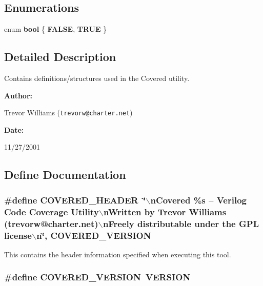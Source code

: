 \subsection*{Enumerations}
\begin{CompactItemize}
\item 
enum {\bf bool} \{ {\bf FALSE}, 
{\bf TRUE}
 \}
\end{CompactItemize}


\subsection{Detailed Description}
Contains definitions/structures used in the Covered utility.



\begin{Desc}
\item[{\bf Author: }]\par
Trevor Williams ({\tt trevorw@charter.net}) \end{Desc}
\begin{Desc}
\item[{\bf Date: }]\par
11/27/2001

\end{Desc}


\subsection{Define Documentation}
\subsubsection{\setlength{\rightskip}{0pt plus 5cm}\#define COVERED\_\-HEADER\ \char`\"{}$\backslash$n\-Covered \%s -- Verilog Code Coverage Utility$\backslash$n\-Written by Trevor Williams  (trevorw@charter.net)$\backslash$n\-Freely distributable under the GPL license$\backslash$n\char`\"{}, COVERED\_\-VERSION}\label{defines_8h_a1}


This contains the header information specified when executing this tool. 
\subsubsection{\setlength{\rightskip}{0pt plus 5cm}\#define COVERED\_\-VERSION\ VERSION}\label{defines_8h_a0}


